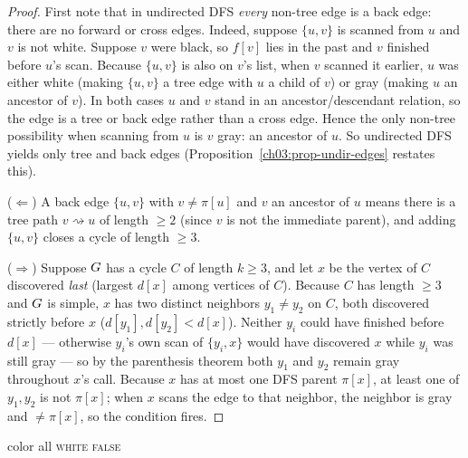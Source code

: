 \begin{proof}
First note that in undirected DFS \emph{every} non-tree edge is a back edge: there are no forward or cross edges. Indeed, suppose $\{u,v\}$ is scanned from $u$ and $v$ is not white. Suppose $v$ were black, so $f[v]$ lies in the past and $v$ finished before $u$'s scan. Because $\{u,v\}$ is also on $v$'s list, when $v$ scanned it earlier, $u$ was either white (making $\{u,v\}$ a tree edge with $u$ a child of $v$) or gray (making $u$ an ancestor of $v$). In both cases $u$ and $v$ stand in an ancestor/descendant relation, so the edge is a tree or back edge rather than a cross edge. Hence the only non-tree possibility when scanning from $u$ is $v$ gray: an ancestor of $u$. So undirected DFS yields only tree and back edges (Proposition~\ref{ch03:prop-undir-edges} restates this).

($\Leftarrow$) A back edge $\{u,v\}$ with $v\ne\pi[u]$ and $v$ an ancestor of $u$ means there is a tree path $v\rightsquigarrow u$ of length $\ge 2$ (since $v$ is not the immediate parent), and adding $\{u,v\}$ closes a cycle of length $\ge 3$.

($\Rightarrow$) Suppose $G$ has a cycle $C$ of length $k\ge 3$, and let $x$ be the vertex of $C$ discovered \emph{last} (largest $d[x]$ among vertices of $C$). Because $C$ has length $\ge 3$ and $G$ is simple, $x$ has two distinct neighbors $y_1\ne y_2$ on $C$, both discovered strictly before $x$ ($d[y_1],d[y_2]<d[x]$). Neither $y_i$ could have finished before $d[x]$ --- otherwise $y_i$'s own scan of $\{y_i,x\}$ would have discovered $x$ while $y_i$ was still gray --- so by the parenthesis theorem both $y_1$ and $y_2$ remain gray throughout $x$'s call. Because $x$ has at most one DFS parent $\pi[x]$, at least one of $y_1,y_2$ is not $\pi[x]$; when $x$ scans the edge to that neighbor, the neighbor is gray and $\ne\pi[x]$, so the condition fires.
\end{proof}

\begin{algorithm}[H]
\DontPrintSemicolon
{}
\BlankLine
color all \textsc{white}\;
\Return \textsc{false}\;
\BlankLine
{}
\caption{Undirected cycle detection (skip the entering edge by identity)}
\label{ch03:alg-undircycle}
\end{algorithm}

